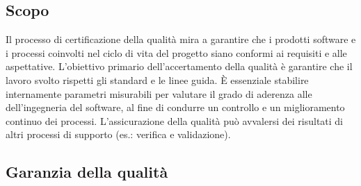 \subsection{Scopo}
\par Il processo di certificazione della qualità mira a garantire che i prodotti software e i processi coinvolti nel ciclo di vita del progetto siano conformi ai requisiti e alle aspettative. L'obiettivo primario dell'accertamento della qualità è garantire che il lavoro svolto rispetti gli standard e le linee guida. È essenziale stabilire internamente parametri misurabili per valutare il grado di aderenza alle  dell'ingegneria del software, al fine di condurre un controllo e un miglioramento continuo dei processi. L'assicurazione della qualità può avvalersi dei risultati di altri processi di supporto (es.: verifica e validazione).

\subsection{Garanzia della qualità}

